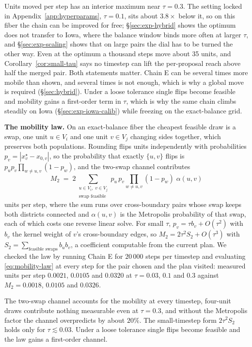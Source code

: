 \documentclass[11pt]{article}
\begin{document}
Units moved per step has an interior maximum near $\tau = 0.3$. The
setting locked in Appendix~\ref{app:hyperparams}, $\tau = 0.1$, sits
about $3.8\times$ below it, so on this fiber the chain can be improved
for free; \S\ref{sec:exp-hybrid} shows the optimum does not transfer
to Iowa, where the balance window binds more often at larger $\tau$,
and \S\ref{sec:exp-scaling} shows that on large pairs the dial has to
be turned the other way. Even at the optimum a thousand steps move
about 35 units, and Corollary~\ref{cor:small-tau} says no timestep can
lift the per-proposal reach above half the merged pair. Both
statements matter. Chain E can be several times more mobile than
shown, and several times is not enough, which is why a global move is
required (\S\ref{sec:hybrid}). Under a loose tolerance single flips
become feasible and mobility gains a first-order term in $\tau$, which
is why the same chain climbs steadily on Iowa
(\S\ref{sec:exp-iowa-calib}) while freezing on the exact-balance grid.

\textbf{The mobility law.} On an exact-balance fiber the cheapest
feasible draw is a swap, one unit $u \in V_i$ and one unit $v \in V_j$
changing sides together, which preserves both populations. Rounding
flips units independently with probabilities
$p_v = |x^\star_v - x_{0,v}|$, so the probability that exactly
$\{u,v\}$ flips is $p_u p_v \prod_{w \ne u,v}(1 - p_w)$, and the
two-swap channel contributes
\begin{equation}\label{eq:mobility-law}
  M_2 \;=\; 2 \sum_{\substack{u \in V_i,\; v \in V_j \\ \text{swap feasible}}}
  p_u\, p_v \prod_{w \ne u,v} (1 - p_w)\;\alpha(u,v)
\end{equation}
units per step, where the sum runs over cross-boundary pairs whose
swap keeps both districts connected and $\alpha(u,v)$ is the
Metropolis probability of that swap, each of which costs one reverse
linear solve. For small $\tau$, $p_v = \tau b_v + O(\tau^2)$ with
$b_v$ the kernel weight of $v$'s cross-boundary edges, so
$M_2 = 2\tau^2 S_2 + O(\tau^3)$ with
$S_2 = \sum_{\text{feasible swaps}} b_u b_v$, a coefficient computable
from the current plan. We checked the law by running Chain E for
$20\,000$ steps per timestep and evaluating \eqref{eq:mobility-law}
at every step for the pair chosen and the plan visited: measured
units per step $0.0021$, $0.0105$ and $0.0320$ at $\tau = 0.03$,
$0.1$ and $0.3$ against $M_2 = 0.0018$, $0.0105$ and $0.0326$.


The two-swap channel accounts for the mobility at every timestep,
four-unit draws contribute nothing measurable even at $\tau = 0.3$,
and without the Metropolis factor the channel overpredicts by about
$20\%$. The small-timestep form $2\tau^2 S_2$ holds only for
$\tau \lesssim 0.03$. Under a loose tolerance single flips become
feasible and the law gains a first-order channel.
\end{document}

